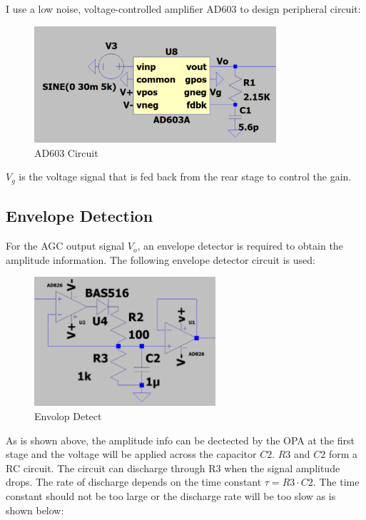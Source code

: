 I use a low noise, voltage-controlled amplifier AD603 to design peripheral circuit:

\begin{figure}[H]
\centering
\includegraphics[width=0.8\textwidth]{./2023Mar/AD603.png}
\caption{AD603 Circuit}
\label{AD603}
\end{figure}

$V_g$ is the voltage signal that is fed back from the rear stage to control the gain.

\subsection*{Envelope Detection}

For the AGC output signal $V_o$, an envelope detector is required to obtain the amplitude information. The following envelope detector circuit is used:

\begin{figure}[H]
\centering
\includegraphics[width=0.6\textwidth]{./2023Mar/EnvolopDetect.png}
\caption{Envolop Detect}
\label{EnvolopDetect}
\end{figure}

As is shown above, the amplitude info can be dectected by the OPA at the first stage and the voltage will be applied across the capacitor $C2$. $R3$ and $C2$ form a RC circuit. The circuit can discharge through R3 when the signal amplitude drops. The rate of discharge depends on the time constant $\tau=R3\cdot C2$. The time constant should not be too large or the discharge rate will be too slow as is shown below:

